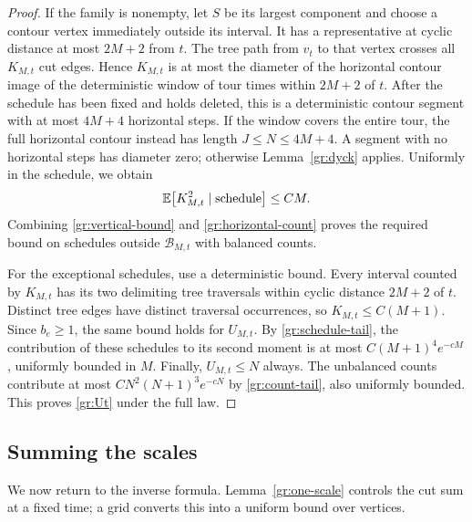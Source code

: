 \begin{proof}
If the family is nonempty, let $S$ be its largest component and
choose a contour vertex immediately outside its interval.  It has
a representative at cyclic distance at most $2M+2$ from $t$.
The tree path from $v_t$ to that vertex crosses all $K_{M,t}$ cut
edges.  Hence $K_{M,t}$ is at most the diameter of the horizontal
contour image of the deterministic window of tour times within
$2M+2$ of $t$.  After the schedule has been fixed and holds deleted,
this is a deterministic contour segment with at most $4M+4$
horizontal steps.  If the window covers the entire tour, the full
horizontal contour instead has length $J\leq N\leq4M+4$.
A segment with no horizontal steps has diameter zero; otherwise
Lemma~\ref{gr:dyck} applies.  Uniformly in the schedule, we obtain
\begin{equation}\label{gr:horizontal-count}
 \mathbb E\bigl[K_{M,t}^2\mid\text{schedule}\bigr]\leq CM.
\end{equation}
Combining \eqref{gr:vertical-bound} and
\eqref{gr:horizontal-count} proves the required bound on schedules
outside $\mathcal B_{M,t}$ with balanced counts.

For the exceptional schedules, use a deterministic bound.
Every interval counted by $K_{M,t}$ has its two delimiting tree
traversals within cyclic distance $2M+2$ of $t$.  Distinct tree
edges have distinct traversal occurrences, so
$K_{M,t}\leq C(M+1)$.  Since $b_e\geq1$, the same bound holds
for $U_{M,t}$.  By \eqref{gr:schedule-tail}, the contribution of
these schedules to its second moment is at most
$C(M+1)^4e^{-cM}$, uniformly bounded in $M$.
Finally, $U_{M,t}\leq N$ always.  The unbalanced counts contribute
at most $CN^2(N+1)^3e^{-cN}$ by \eqref{gr:count-tail}, also
uniformly bounded.  This proves \eqref{gr:Ut} under the full law.
\end{proof}

\subsection{Summing the scales}

We now return to the inverse formula.  Lemma~\ref{gr:one-scale}
controls the cut sum at a fixed time; a grid converts this into a
uniform bound over vertices.

